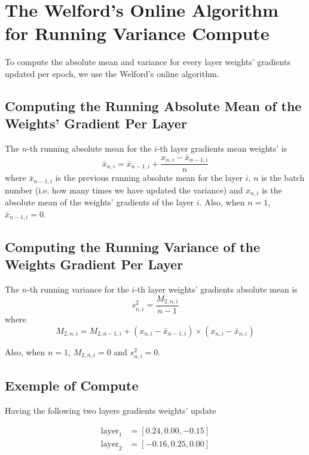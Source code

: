 \documentclass[MSc,english,french]{ulthese}
\begin{document}
\chapter*{The Welford's Online Algorithm for Running Variance Compute}
To compute the absolute mean and variance for every layer weights' gradients updated per epoch, we use the Welford's online algorithm. 

\section*{Computing the Running Absolute Mean of the Weights' Gradient Per Layer}
The $n$-th running absolute mean for the $i$-th layer gradients mean weights' is
\begin{equation*}
\bar{x}_{n, i} = \bar{x}_{n - 1 , i} + \frac{x_{n, i} - \bar{x}_{n - 1, i} }{n}
\end{equation*}	
where $\bar{x}_{n - 1, i}$ is the previous running absolute mean for the layer $i$, $n$ is the batch number (i.e. how many times we have updated the variance) and $x_{n, i}$ is the absolute mean of the weights' gradients of the layer $i$. Also, when $n = 1$, $\bar{x}_{n - 1, i} = 0$.

\section*{Computing the Running Variance of the Weights Gradient Per Layer}
The $n$-th running variance for the $i$-th layer weights' gradients absolute mean is
\begin{equation*}
s^2_{n, i} = \frac{M_{2, n, i}}{n - 1}
\end{equation*}	
where
\begin{equation*}
M_{2, n, i} = M_{2, n- 1, i} + (x_{n, i} - \bar{x}_{n-1, i}) \times (x_{n, i} - \bar{x}_{n, i})
\end{equation*}

Also, when $n = 1$, $M_{2, n, i} = 0$ and $s^2_{n, i} = 0$.

\newpage
\section*{Exemple of Compute}
Having the following two layers gradients weights' update

\begin{align*}
\text{layer}_1 &= [ 0.24, 0.00, -0.15] \\
\text{layer}_2 &= [-0.16, 0.25, 0.00]
\end{align*}
\end{document}
